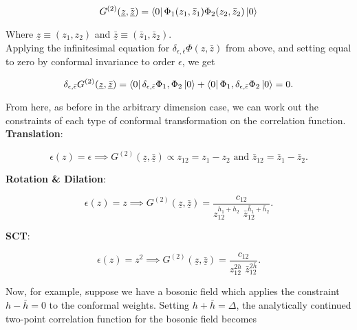 \begin{equation}
G^{(2)} (\underline{z}, \bar{\underline{z}}) = \bra{0} \Phi_1 (z_1, \bar{z}_1) \Phi_2 (z_2, \bar{z}_2) \ket{0}
\end{equation}

\noindent Where $\underline{z} \equiv (z_1, z_2)$ and $\underline{\bar{z}} \equiv (\bar{z}_1, \bar{z}_2)$. \\

\noindent Applying the infinitesimal equation for $\delta_{\epsilon, \bar{\epsilon}} \Phi (z, \bar{z})$ from above, and setting equal to zero by conformal invariance to order $\epsilon$, we get

\begin{equation}
\delta_{\epsilon, \bar{\epsilon}} G^{(2)} (\underline{z}, \underline{\bar{z}}) = \bra{0} \delta_{\epsilon, \bar{\epsilon}} \Phi_1, \Phi_2 \ket{0} + \bra{0} \Phi_1, \delta_{\epsilon, \bar{\epsilon}} \Phi_2 \ket{0} = 0.
\end{equation}

\noindent From here, as before in the arbitrary dimension case, we can work out the constraints of each type of conformal transformation on the correlation function. \\

\noindent \textbf{Translation}: 

\begin{equation}
\epsilon(z) = \epsilon \implies G^{(2)}(\underline{z}, \underline{\bar{z}}) \propto z_{12} = z_1 - z_2 \text{ and }\bar{z}_{12} = \bar{z}_1 - \bar{z}_2.
\end{equation}

\noindent \textbf{Rotation \& Dilation}: 

\begin{equation}
\epsilon (z) = z \implies G^{(2)}(\underline{z}, \underline{\bar{z}}) = \frac{c_{12}}{z_{12}^{h_1 + h_2} \,\, \bar{z}_{12}^{\bar{h}_1 + \bar{h}_2}}.
\end{equation}

\noindent \textbf{SCT}: 

\begin{equation}
\epsilon (z) = z^2 \implies G^{(2)}(\underline{z}, \underline{\bar{z}}) = \frac{c_{12}}{z_{12}^{2h} \, \, \bar{z}_{12}^{2\bar{h}}}.
\end{equation}

\noindent Now, for example, suppose we have a bosonic field which applies the constraint $h-\bar{h}=0$ to the conformal weights. Setting $h+\bar{h} = \Delta$, the analytically continued two-point correlation function for the bosonic field becomes

